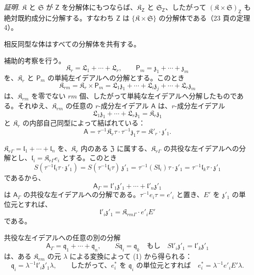 \emph{証明.} \(\mathfrak K\) と \(\mathfrak S\) が \(\mathsf{Z}\) を分解体にもつならば、\(\mathfrak K_{\mathsf{Z}}\) と \(\mathfrak S_{\mathsf{Z}}\)、したがって \((\mathfrak K\times\mathfrak S)_{\mathsf{Z}}\) も絶対既約成分に分解する。すなわち \(\mathsf{Z}\) は \(\{\mathfrak K\times\mathfrak S\}\) の分解体である（23 頁の定理 4）。

相反同型な体はすべての分解体を共有する。

補助的考察を行う。
\[
\mathfrak K_r=\mathfrak L_1+\cdots+\mathfrak L_r,\qquad
\mathsf P_m=\mathfrak z_1+\cdots+\mathfrak z_m
\]
を、\(\mathfrak K_r\) と \(\mathsf P_m\) の単純左イデアルへの分解とする。このとき
\[
\mathfrak K_{rm}=\mathfrak K_r\times\mathsf P_m
=\mathfrak L_1\mathfrak z_1+\cdots+\mathfrak L_i\mathfrak z_j+\cdots+\mathfrak L_r\mathfrak z_m
\]
は、\(\mathfrak K_{rm}\) を零でない \(rm\) 個、したがって単純な左イデアルへ分解したものである。それゆえ、\(\mathfrak K_{rm}\) の任意の \(r\)-成分左イデアル \(\mathsf{A}\) は、\(r\)-成分左イデアル
\[
\mathfrak L_1\mathfrak z_1+\cdots+\mathfrak L_r\mathfrak z_1=\mathfrak K_r\mathfrak z_1
\]
と \(\mathfrak K_r\) の内部自己同型によって結ばれている：
\[
\mathsf{A}=\tau^{-1}\mathfrak K_r\tau\cdot\tau^{-1}\mathfrak z_1\tau
=\mathfrak K'_r\cdot\mathfrak z'_1.
\]

\(\mathfrak K_{r\Gamma}=\mathfrak l_1+\cdots+\mathfrak l_n\) を、\(\mathfrak K_r\) 内のある \(\mathfrak Z\) に属する、\(\mathfrak K_{r\Gamma}\) の共役な左イデアルへの分解とし、\(\mathfrak l_i=\mathfrak K_{r\Gamma}e_i\) とする。このとき
\[
S(\tau^{-1}\mathfrak l_i\tau\cdot\mathfrak z'_1)
=S(\tau^{-1}\mathfrak l_i\tau)\,\mathfrak z'_1
=\tau^{-1}(S\mathfrak l_i)\tau\cdot\mathfrak z'_1
=\tau^{-1}\mathfrak l_k\tau\cdot\mathfrak z'_1
\]
であるから、
\[
\tag{1}
\mathsf{A}_\Gamma=\mathfrak l'_1\mathfrak z'_1+\cdots+\mathfrak l'_n\mathfrak z'_1
\]
は \(\mathsf{A}_\Gamma\) の共役な左イデアルへの分解である。\(\tau^{-1}e_i\tau=e'_i\) と置き、\(E'\) を \(\mathfrak z'_1\) の単位元とすれば、
\[
\mathfrak l'_i\mathfrak z'_1=\mathfrak K_{rm\Gamma}\cdot e'_iE'
\]
である。

共役な左イデアルへの任意の別の分解
\[
\tag{2}
\mathsf{A}_\Gamma=\mathfrak q_1+\cdots+\mathfrak q_n,\qquad
S\mathfrak q_i=\mathfrak q_k\quad\text{もし}\quad
S\mathfrak l'_i\mathfrak z'_1=\mathfrak l'_k\mathfrak z'_1
\]
は、ある \(\mathfrak K_{rm}\) の元 \(\lambda\) による変換によって (1) から得られる：
\[
\mathfrak q_i=\lambda^{-1}\mathfrak l'_i\mathfrak z'_1\lambda,
\qquad
\text{したがって、\(e_i^*\) を \(\mathfrak q_i\) の単位元とすれば}\quad
e_i^*=\lambda^{-1}e'_iE'\lambda.
\]

